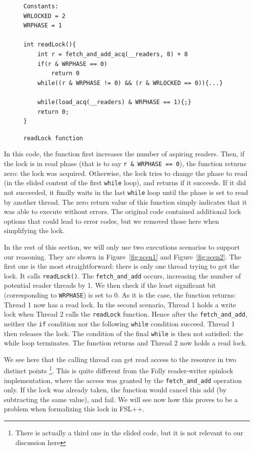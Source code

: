 \begin{figure}
		\begin{lstlisting}
Constants:
WRLOCKED = 2
WRPHASE = 1

int readLock(){
	int r = fetch_and_add_acq(__readers, 8) + 8
	if(r & WRPHASE == 0)
		return 0
	while((r & WRPHASE != 0) && (r & WRLOCKED == 0)){...}

	while(load_acq(__readers) & WRPHASE == 1){;}
	return 0;
}

	\end{lstlisting}
	\caption{\texttt{readLock function}}
	\label{fig:codeglibc}
\end{figure}

In this code, the function first increases the number of aspiring readers. Then, if the lock is in read phase (that is to say \texttt{r \& WRPHASE == 0}), the function returns zero: the lock was acquired. Otherwise, the lock tries to change the phase to read (in the elided content of the first \texttt{while} loop), and returns if it succeeds. If it did not succeeded, it finally waits in the last \texttt{while} loop until the phase is set to read by another thread. The zero return value of this function simply indicates that it was able to execute without errors. The original code contained additional lock options that could lead to error codes, but we removed those here when simplifying the lock.

In the rest of this section, we will only use two executions scenarios to support our reasoning. They are shown in Figure~\ref{fig:scen1} and Figure~\ref{fig:scen2}. The first one is the most straightforward: there is only one thread trying to get the lock. It calls \texttt{readLock()}. The \texttt{fetch\_and\_add} occurs, increasing the number of potential reader threads by 1. We then check if the least significant bit (corresponding to \texttt{WRPHASE}) is set to 0. As it is the case, the function returns: Thread 1 now has a read lock. In the second scenario, Thread 1 holds a write lock when Thread 2 calls the \texttt{readLock} function. Hence after the \texttt{fetch\_and\_add}, neither the \texttt{if} condition nor the following \texttt{while} condition succeed. Thread 1 then releases the lock. The condition of the final \texttt{while} is then not satisfied: the while loop terminates. The function returns and Thread 2 now holds a read lock.

We see here that the calling thread can get read access to the resource in two distinct points \footnote{There is actually a third one in the elided code, but it is not relevant to our discussion here}. This is quite different from the Folly reader-writer spinlock implementation, where the access was granted by the \texttt{fetch\_and\_add} operation only. If the lock was already taken, the function would cancel this add (by subtracting the same value), and fail. We will see now how this proves to be a problem when formalizing this lock in FSL++.


